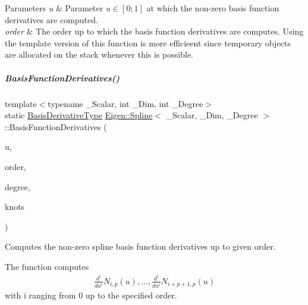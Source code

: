 \begin{DoxyParams}{Parameters}
{\em u} & Parameter $u \in [0;1]$ at which the non-\/zero basis function derivatives are computed. \\
\hline
{\em order} & The order up to which the basis function derivatives are computes. Using the template version of this function is more efficieent since temporary objects are allocated on the stack whenever this is possible. \\
\hline
\end{DoxyParams}
\mbox{\label{group___splines___module_a2e42e79b08b560007062b8f56689ae24}} 
\subparagraph{\texorpdfstring{Basis\+Function\+Derivatives()}{BasisFunctionDerivatives()}\hspace{0.1cm}{\footnotesize\ttfamily [1/2]}}
{\footnotesize\ttfamily template$<$typename \+\_\+\+Scalar, int \+\_\+\+Dim, int \+\_\+\+Degree$>$ \\
static \hyperlink{group___splines___module_a9db0b0108353660cd03524f2e67d6b3c}{Basis\+Derivative\+Type} \hyperlink{group___splines___module_class_eigen_1_1_spline}{Eigen\+::\+Spline}$<$ \+\_\+\+Scalar, \+\_\+\+Dim, \+\_\+\+Degree $>$\+::Basis\+Function\+Derivatives (\begin{DoxyParamCaption}\item[{const \hyperlink{group___splines___module_a8cafd78b564825c76fbb3419653d9742}{Scalar}}]{u,  }\item[{const Dense\+Index}]{order,  }\item[{const Dense\+Index}]{degree,  }\item[{const \hyperlink{group___splines___module_a066f7a8b120316c9068b559f0790e9ec}{Knot\+Vector\+Type} \&}]{knots }\end{DoxyParamCaption})\hspace{0.3cm}{\ttfamily [static]}}



Computes the non-\/zero spline basis function derivatives up to given order. 

The function computes \begin{align*} \frac{d^i}{du^i} N_{i,p}(u), \hdots, \frac{d^i}{du^i} N_{i+p+1,p}(u) \end{align*} with i ranging from 0 up to the specified order.


